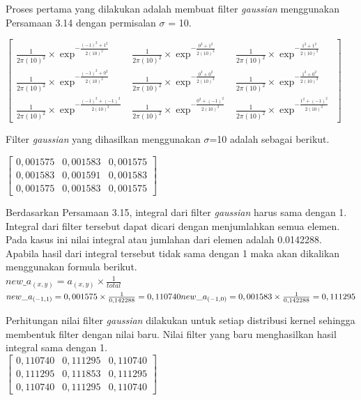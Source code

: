 Proses pertama yang dilakukan adalah membuat filter \emph{gaussian} menggunakan Persamaan 3.14 dengan permisalan $\sigma$ = 10.

\noindent
$\left[
\begin{matrix}
	\frac{1}{2\pi(10)^2}\times \exp^{-\frac{(-1)^2+1^2}{2(10)^2}} & \frac{1}{2\pi(10)^2}\times \exp^{-\frac{0^2+1^2}{2(10)^2}} &\frac{1}{2\pi(10)^2}\times \exp^{-\frac{1^2+1^2}{2(10)^2}} \\
	\frac{1}{2\pi(10)^2}\times \exp^{-\frac{(-1)^2+0^2}{2(10)^2}} & \frac{1}{2\pi(10)^2}\times \exp^{-\frac{0^2+0^2}{2(10)^2}} &\frac{1}{2\pi(10)^2}\times \exp^{-\frac{1^2+0^2}{2(10)^2}} \\
	\frac{1}{2\pi(10)^2}\times \exp^{-\frac{(-1)^2+(-1)^2}{2(10)^2}} & \frac{1}{2\pi(10)^2}\times \exp^{-\frac{0^2+(-1)^2}{2(10)^2}} &\frac{1}{2\pi(10)^2}\times \exp^{-\frac{1^2+(-1)^2}{2(10)^2}} 	
\end{matrix}
\right]$

\noindent Filter \emph{gaussian} yang dihasilkan menggunakan $\sigma$=10 adalah sebagai berikut.

\noindent
$\left[
\begin{matrix}
	0,001575 & 0,001583 & 0,001575
	 \\
	0,001583 & 0,001591 & 0,001583
	\\
	0,001575 & 0,001583 & 0,001575
\end{matrix}
\right]$

\noindent Berdasarkan Persamaan 3.15, integral dari filter \emph{gaussian} harus sama dengan 1. Integral dari filter tersebut dapat dicari dengan menjumlahkan semua elemen. Pada kasus ini nilai integral atau jumlahan dari elemen adalah 0.0142288. Apabila hasil dari integral tersebut tidak sama dengan 1 maka akan dikalikan menggunakan formula berikut.\\
$
new\_a_{(x,y)}=a_{(x,y)}\times\frac{1}{total}
$\\
$
new\_a_{(-1,1)}=0,001575\times\frac{1}{0,142288}=0,110740\\
new\_a_{(-1,0)}=0,001583\times\frac{1}{0,142288}=0,111295
$

\noindent Perhitungan nilai filter \emph{gaussian} dilakukan untuk setiap distribusi kernel sehingga membentuk filter dengan nilai baru. Nilai filter yang baru menghasilkan hasil integral sama dengan 1.\\

\noindent
$\left[
\begin{matrix}
0,110740&0,111295&0,110740\\
0,111295&0,111853&0,111295\\
0,110740&0,111295&0,110740
\end{matrix}
\right]$

